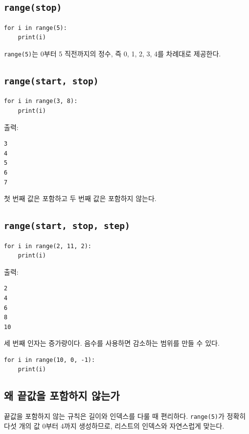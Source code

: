 \documentclass[11pt,a4paper]{article}
\begin{document}
\subsection{\texttt{range(stop)}}

\begin{lstlisting}
for i in range(5):
    print(i)
\end{lstlisting}

\texttt{range(5)}는 0부터 5 직전까지의 정수, 즉 0, 1, 2, 3, 4를 차례대로 제공한다.

\subsection{\texttt{range(start, stop)}}

\begin{lstlisting}
for i in range(3, 8):
    print(i)
\end{lstlisting}

출력:

\begin{verbatim}
3
4
5
6
7
\end{verbatim}

첫 번째 값은 포함하고 두 번째 값은 포함하지 않는다.

\subsection{\texttt{range(start, stop, step)}}

\begin{lstlisting}
for i in range(2, 11, 2):
    print(i)
\end{lstlisting}

출력:

\begin{verbatim}
2
4
6
8
10
\end{verbatim}

세 번째 인자는 증가량이다. 음수를 사용하면 감소하는 범위를 만들 수 있다.

\begin{lstlisting}
for i in range(10, 0, -1):
    print(i)
\end{lstlisting}

\subsection{왜 끝값을 포함하지 않는가}

끝값을 포함하지 않는 규칙은 길이와 인덱스를 다룰 때 편리하다. \texttt{range(5)}가 정확히 다섯 개의 값 0부터 4까지 생성하므로, 리스트의 인덱스와 자연스럽게 맞는다.
\end{document}
